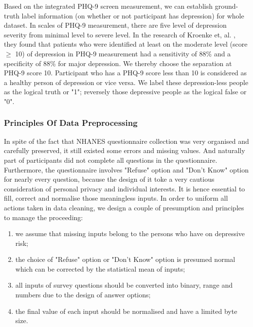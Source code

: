 \documentclass[10pt,journal,compsoc]{IEEEtran}
\begin{document}
Based on the integrated PHQ-9 screen measurement, we can establish ground-truth label information (on whether or not participant has depression) for whole dataset. In scales of PHQ-9 measurement, there are five level of depression severity from minimal level to severe level. In the research of Kroenke et, al. \cite{Kroenke}, they found that patients who were identified at least on the moderate level (score $\geq$ 10) of depression in PHQ-9 measurement had a sensitivity of 88\% and a specificity of 88\% for major depression. We thereby choose the separation at PHQ-9 score 10. Participant who has a PHQ-9 score less than 10 is considered as a healthy person of depression or vice versa. We label these depression-less people as the logical truth or "1"; reversely those depressive people as the logical false or  "0".
%
%
\subsubsection{Principles Of Data Preprocessing}
In spite of the fact that NHANES questionnaire collection was very organised and carefully preserved, it still existed some errors and missing values. And naturally part of participants did not complete all questions in the questionnaire. Furthermore,  the questionnaire involves "Refuse" option and "Don't Know" option for nearly every question, because the design of it toke a very cautious consideration of personal privacy and individual interests. It is hence essential to fill, correct and normalise those meaningless inputs. In order to uniform all actions taken in data cleaning, we design a couple of presumption and principles to manage the proceeding:
\begin{enumerate}[label=\alph*)]
	\item	  we assume that missing inputs belong to the persons who have on depressive risk;
	\item   the choice of "Refuse" option or "Don't Know" option is presumed normal which can be corrected by the statistical mean of inputs;
	\item	  all inputs of survey questions should be converted into binary, range and numbers due to the design of answer options;
	\item	  the final value of each input should be normalised and have a limited byte size.\\
\end{enumerate}
%
%
\end{document}
